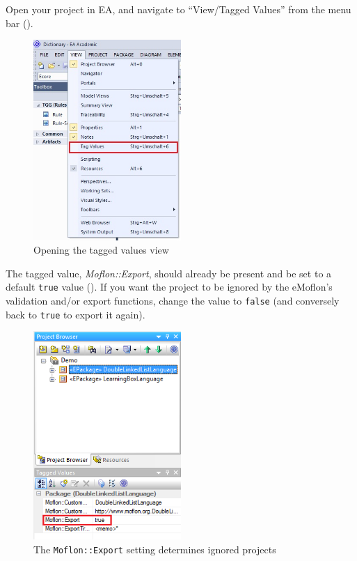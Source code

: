 \begin{stepbystep}

\item Open your project in EA, and navigate to ``View/Tagged Values'' from the menu bar ().

\begin{figure}[htbp]
\begin{center}  \includegraphics[width=0.5\textwidth]{ea_viewTaggedValues}
  \caption{Opening the tagged values view}  
  \label{ea:view/Taggedvalues}
\end{center}
\end{figure} 

\item The tagged value, \emph{Moflon::Export}, should already be present and be set to a default \texttt{true} value
(). If you want the project to be ignored by the eMoflon's validation and/or export functions, change the value to
\texttt{false} (and conversely back to \texttt{true} to export it again).

\begin{figure}[htbp]
\begin{center}
\includegraphics[width=0.5\textwidth]{ea_moflonExportTG}
  \caption{The \texttt{Moflon::Export} setting determines ignored projects}  
  \label{ea:moflonExportTG}
\end{center}
\end{figure}

\end{stepbystep}
